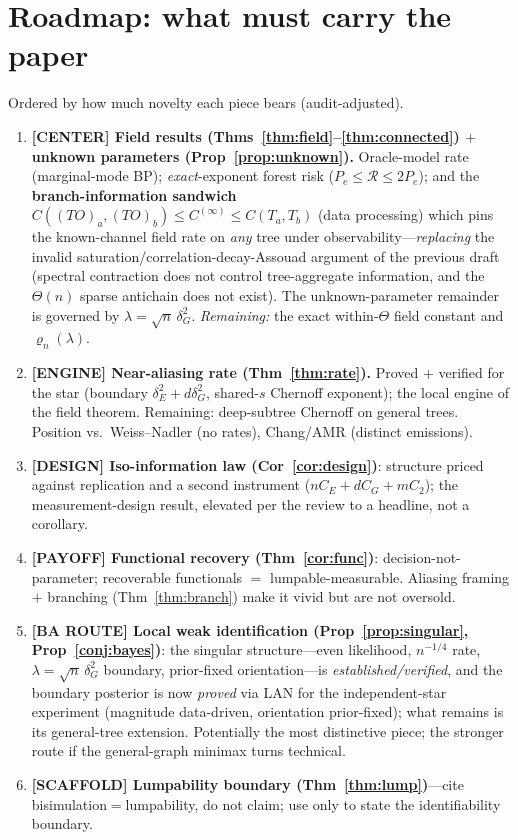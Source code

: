 \documentclass[11pt]{article}
\begin{document}
\section{Roadmap: what must carry the paper}
Ordered by how much novelty each piece bears (audit-adjusted).
\begin{enumerate}[leftmargin=*,itemsep=1pt]
  \item \textbf{[CENTER] Field results (Thms~\ref{thm:field}--\ref{thm:connected}) $+$ unknown parameters
  (Prop~\ref{prop:unknown}).} Oracle-model rate (marginal-mode BP); \emph{exact}-exponent forest risk
  ($P_e\le\mathcal R\le2P_e$); and the \textbf{branch-information sandwich}
  $C((TO)_a,(TO)_b)\le C^{(\infty)}\le C(T_a,T_b)$ (data processing) which pins the known-channel field rate on
  \emph{any} tree under observability---\emph{replacing} the invalid saturation/correlation-decay-Assouad argument
  of the previous draft (spectral contraction does not control tree-aggregate information, and the $\Theta(n)$
  sparse antichain does not exist). The unknown-parameter remainder is governed by $\lambda=\sqrt n\,\delta_G^2$.
  \emph{Remaining:} the exact within-$\Theta$ field constant and $\varrho_n(\lambda)$.
  \item \textbf{[ENGINE] Near-aliasing rate (Thm~\ref{thm:rate}).} Proved + verified for the star (boundary
  $\delta_E^2+d\delta_G^2$, shared-$s$ Chernoff exponent); the local engine of the field theorem. Remaining:
  deep-subtree Chernoff on general trees. Position vs.\ Weiss--Nadler (no rates), Chang/AMR (distinct emissions).
  \item \textbf{[DESIGN] Iso-information law (Cor~\ref{cor:design})}: structure priced against replication and a
  second instrument ($nC_E+dC_G+mC_2$); the measurement-design result, elevated per the review to a headline, not
  a corollary.
  \item \textbf{[PAYOFF] Functional recovery (Thm~\ref{cor:func})}: decision-not-parameter; recoverable
  functionals $=$ lumpable-measurable. Aliasing framing $+$ branching (Thm~\ref{thm:branch}) make it vivid but are
  not oversold.
  \item \textbf{[BA ROUTE] Local weak identification (Prop~\ref{prop:singular}, Prop~\ref{conj:bayes})}: the
  singular structure---even likelihood, $n^{-1/4}$ rate, $\lambda=\sqrt n\,\delta_G^2$ boundary, prior-fixed
  orientation---is \emph{established/verified}, and the boundary posterior is now \emph{proved} via LAN for the
  independent-star experiment (magnitude data-driven, orientation prior-fixed); what remains is its general-tree
  extension. Potentially the most distinctive piece; the stronger route if the general-graph minimax turns technical.
  \item \textbf{[SCAFFOLD] Lumpability boundary (Thm~\ref{thm:lump})}---cite bisimulation$=$lumpability, do not
  claim; use only to state the identifiability boundary.
\end{enumerate}
\end{document}
